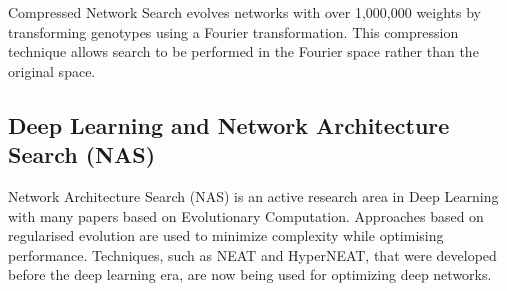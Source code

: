 Compressed Network Search evolves networks with over 1,000,000 weights by transforming genotypes using a Fourier transformation. This compression technique allows search to be performed in the Fourier space rather than the original space.

\subsection*{Deep Learning and Network Architecture Search (NAS)}

Network Architecture Search (NAS) is an active research area in Deep Learning with many papers based on Evolutionary Computation.  Approaches based on regularised evolution are used to minimize complexity while optimising performance. Techniques, such as NEAT and HyperNEAT, that were developed before the deep learning era, are now being used for optimizing deep networks.
